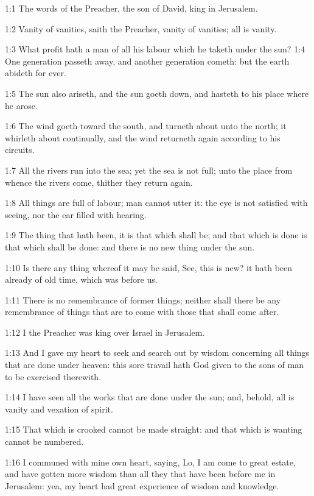 
1:1 The words of the Preacher, the son of David, king in Jerusalem.

1:2 Vanity of vanities, saith the Preacher, vanity of vanities; all is
vanity.

1:3 What profit hath a man of all his labour which he taketh under the
sun?  1:4 One generation passeth away, and another generation cometh:
but the earth abideth for ever.

1:5 The sun also ariseth, and the sun goeth down, and hasteth to his
place where he arose.

1:6 The wind goeth toward the south, and turneth about unto the north;
it whirleth about continually, and the wind returneth again according
to his circuits.

1:7 All the rivers run into the sea; yet the sea is not full; unto the
place from whence the rivers come, thither they return again.

1:8 All things are full of labour; man cannot utter it: the eye is not
satisfied with seeing, nor the ear filled with hearing.

1:9 The thing that hath been, it is that which shall be; and that
which is done is that which shall be done: and there is no new thing
under the sun.

1:10 Is there any thing whereof it may be said, See, this is new? it
hath been already of old time, which was before us.

1:11 There is no remembrance of former things; neither shall there be
any remembrance of things that are to come with those that shall come
after.

1:12 I the Preacher was king over Israel in Jerusalem.

1:13 And I gave my heart to seek and search out by wisdom concerning
all things that are done under heaven: this sore travail hath God
given to the sons of man to be exercised therewith.

1:14 I have seen all the works that are done under the sun; and,
behold, all is vanity and vexation of spirit.

1:15 That which is crooked cannot be made straight: and that which is
wanting cannot be numbered.

1:16 I communed with mine own heart, saying, Lo, I am come to great
estate, and have gotten more wisdom than all they that have been
before me in Jerusalem: yea, my heart had great experience of wisdom
and knowledge.

